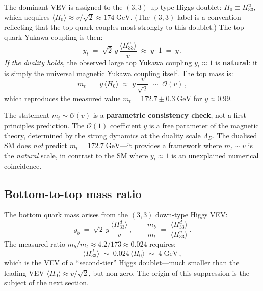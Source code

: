 \documentclass[11pt,a4paper]{article}
\begin{document}
The dominant VEV is assigned to the $(3,3)$ up-type Higgs doublet:
$H_0 \equiv H_{33}^u$, which acquires
$\langle H_0 \rangle \approx v/\sqrt{2} \approx 174\;\text{GeV}$.  (The
$(3,3)$ label is a convention reflecting that the top quark couples most
strongly to this doublet.)  The top quark Yukawa coupling is then:
\begin{equation}\label{eq:top-yukawa}
  y_t \;=\; \sqrt{2}\, y \,\frac{\langle H_{33}^u \rangle}{v}
  \;\approx\; y \cdot 1
  \;=\; y\,.
\end{equation}
\emph{If the duality holds}, the observed large top Yukawa coupling
$y_t \approx 1$ is \textbf{natural}: it is simply the universal
magnetic Yukawa coupling itself.  The top mass is:
\begin{equation}\label{eq:top-mass}
  m_t \;=\; y\, \langle H_0 \rangle
  \;\approx\; y\, \frac{v}{\sqrt{2}}
  \;\sim\; \mathcal{O}(v)\,,
\end{equation}
which reproduces the measured value $m_t = 172.7 \pm 0.3\;\text{GeV}$
for $y \approx 0.99$.

\begin{warningbox}[title={Parametric consistency, not prediction}]
  The statement $m_t \sim \mathcal{O}(v)$ is a \textbf{parametric
  consistency check}, not a first-principles prediction.  The
  $\mathcal{O}(1)$ coefficient $y$ is a free parameter of the magnetic
  theory, determined by the strong dynamics at the duality scale
  $\Lambda_D$.  The dualised SM does \emph{not} predict
  $m_t = 172.7\;\text{GeV}$---it provides a framework where
  $m_t \sim v$ is the \emph{natural} scale, in contrast to the SM where
  $y_t \approx 1$ is an unexplained numerical coincidence.
\end{warningbox}

\subsection{Bottom-to-top mass ratio}

The bottom quark mass arises from the $(3,3)$ down-type Higgs VEV:
\begin{equation}\label{eq:bottom-yukawa}
  y_b \;=\; \sqrt{2}\, y\, \frac{\langle H_{33}^d \rangle}{v}\,,
  \qquad
  \frac{m_b}{m_t}
  \;=\; \frac{\langle H_{33}^d \rangle}{\langle H_{33}^u \rangle}\,.
\end{equation}
The measured ratio $m_b / m_t \approx 4.2 / 173 \approx 0.024$
requires:
\begin{equation}\label{eq:vev-ratio-bt}
  \langle H_{33}^d \rangle
  \;\sim\; 0.024\, \langle H_0 \rangle
  \;\sim\; 4\;\text{GeV}\,,
\end{equation}
which is the VEV of a ``second-tier'' Higgs doublet---much smaller than
the leading VEV $\langle H_0 \rangle \approx v/\sqrt{2}$, but non-zero.  The
origin of this suppression is the subject of the next section.
\end{document}
